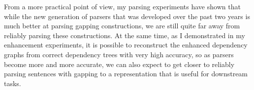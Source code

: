 \documentclass[lucida,biblatex]{sp} %
\begin{document}
From a more practical point of view, my parsing experiments have shown that while the new generation of parsers that was developed over the past two years is much better at parsing gapping constructions, we are still quite far away from reliably parsing these constructions. At the same time, as I demonstrated in my enhancement experiments, it is possible to reconstruct the enhanced dependency graphs from correct dependency trees with very high accuracy, so as parsers become more and more accurate, we can also expect to get closer to reliably parsing sentences with gapping to a representation that is useful for downstream tasks. 




\printbibliography
%




\end{document}
